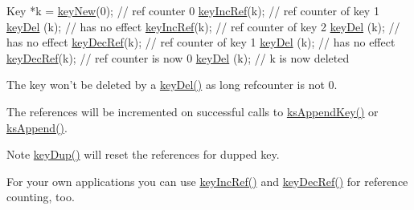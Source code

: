 \begin{DoxyCodeInclude}
Key *k = \hyperlink{group__key_gad23c65b44bf48d773759e1f9a4d43b89}{keyNew}(0); \textcolor{comment}{// ref counter 0}
\hyperlink{group__key_ga6970a6f254d67af7e39f8e469bb162f1}{keyIncRef}(k); \textcolor{comment}{// ref counter of key 1}
\hyperlink{group__key_ga3df95bbc2494e3e6703ece5639be5bb1}{keyDel} (k);   \textcolor{comment}{// has no effect}
\hyperlink{group__key_ga6970a6f254d67af7e39f8e469bb162f1}{keyIncRef}(k); \textcolor{comment}{// ref counter of key 2}
\hyperlink{group__key_ga3df95bbc2494e3e6703ece5639be5bb1}{keyDel} (k);   \textcolor{comment}{// has no effect}
\hyperlink{group__key_ga2c6433ca22109e4e141946057eccb283}{keyDecRef}(k); \textcolor{comment}{// ref counter of key 1}
\hyperlink{group__key_ga3df95bbc2494e3e6703ece5639be5bb1}{keyDel} (k);   \textcolor{comment}{// has no effect}
\hyperlink{group__key_ga2c6433ca22109e4e141946057eccb283}{keyDecRef}(k); \textcolor{comment}{// ref counter is now 0}
\hyperlink{group__key_ga3df95bbc2494e3e6703ece5639be5bb1}{keyDel} (k); \textcolor{comment}{// k is now deleted}
\end{DoxyCodeInclude}
 The key won't be deleted by a \hyperlink{group__key_ga3df95bbc2494e3e6703ece5639be5bb1}{key\-Del()} as long refcounter is not 0.

The references will be incremented on successful calls to \hyperlink{group__keyset_gaa5a1d467a4d71041edce68ea7748ce45}{ks\-Append\-Key()} or \hyperlink{group__keyset_ga21eb9c3a14a604ee3a8bdc779232e7b7}{ks\-Append()}.

\begin{DoxyNote}{Note}
\hyperlink{group__key_gae6ec6a60cc4b8c1463fa08623d056ce3}{key\-Dup()} will reset the references for dupped key.
\end{DoxyNote}
For your own applications you can use \hyperlink{group__key_ga6970a6f254d67af7e39f8e469bb162f1}{key\-Inc\-Ref()} and \hyperlink{group__key_ga2c6433ca22109e4e141946057eccb283}{key\-Dec\-Ref()} for reference counting, too.


